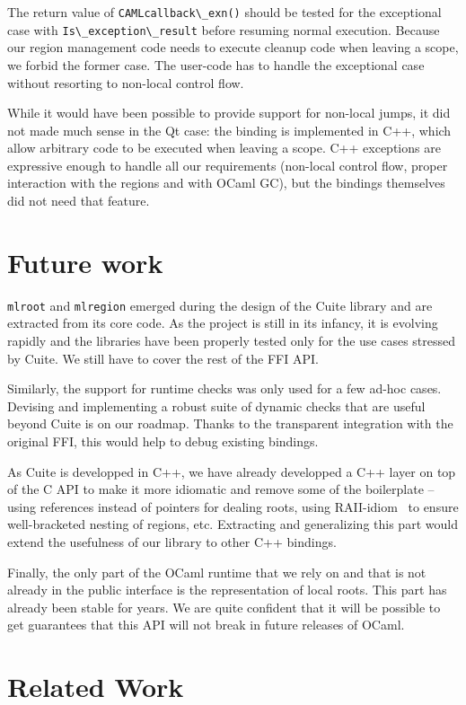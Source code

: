 \documentclass[a4paper]{easychair}
\newcommand{\cpp}[1]{\lstinline[style=C++]{#1}}
\begin{document}
The return value of \cpp{CAMLcallback\_exn()} should be tested for
the exceptional case with \cpp{Is\_exception\_result} before resuming
normal execution.  Because our region management code needs to execute cleanup
code when leaving a scope, we forbid the former case. The user-code has to
handle the exceptional case without resorting to non-local control flow.

While it would have been possible to provide support for non-local
jumps, it did not made much sense in the Qt case: the binding is
implemented in C++, which allow arbitrary code to be executed when
leaving a scope. C++ exceptions are expressive enough to handle all our
requirements (non-local control flow, proper interaction with the
regions and with OCaml GC), but the bindings themselves did not need
that feature.

\section{Future work}

\cpp{mlroot} and \cpp{mlregion} emerged during the design of the Cuite library
and are extracted from its core code.  As the project is still in its infancy,
it is evolving rapidly and the libraries have been properly tested only for the
use cases stressed by Cuite. We still have to cover the rest of the FFI API.

Similarly, the support for runtime checks was only used for a few ad-hoc
cases. Devising and implementing a robust suite of dynamic checks that are
useful beyond Cuite is on our roadmap. Thanks to the transparent integration
with the original FFI, this would help to debug existing bindings.

As Cuite is developped in C++, we have already developped a C++ layer on top of
the C API to make it more idiomatic and remove some of the boilerplate --
using references instead of pointers for dealing roots, using
RAII-idiom~\citep{Stroustrup:1995:DEC:193198} to ensure well-bracketed nesting
of regions, etc.
Extracting and generalizing this part would extend the usefulness of our
library to other C++ bindings.

Finally, the only part of the OCaml runtime that we rely on and that is not
already in the public interface is the representation of local roots. 
This part has already been stable for years. We are quite confident that it
will be possible to get guarantees that this API will not break in future
releases of OCaml.

\section{Related Work}
\end{document}
